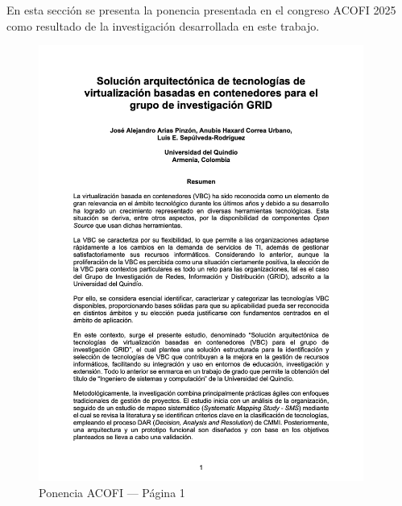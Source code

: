 \noindent
En esta sección se presenta la ponencia presentada en el congreso ACOFI 2025 como resultado de la investigación desarrollada en este trabajo.

\begin{figure}[H]
    \centering
    \begin{tcolorbox}[
        colback=white,
        colframe=gray!50,
        boxrule=1pt,
        arc=2pt,
        boxsep=5pt,
        left=3pt,
        right=3pt,
        top=3pt,
        bottom=3pt,
        drop shadow
    ]
        \includegraphics[width=0.95\textwidth,keepaspectratio]{apendices/ACOFI/pagina_1.png}
    \end{tcolorbox}
    \caption{Ponencia ACOFI --- Página 1}\label{fig:acofi-pagina-1}
\end{figure}
\FloatBarrier%
